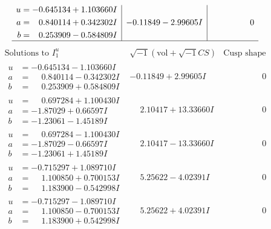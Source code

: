 \documentclass[1p]{elsarticle_modified}
\theoremstyle{definition}
\newcommand{\I}{\sqrt{-1}}
\begin{document}
$$\begin{array}{c|c|c}
\begin{aligned}
u &= -0.645134 + 1.103660 I \\
a &= \phantom{-}0.840114 + 0.342302 I \\
b &= \phantom{-}0.253909 - 0.584809 I\end{aligned}
 & -0.11849 - 2.99605 I & \phantom{-0.000000 } 0\\
 \hline 
 \end{array}$$\newpage$$\begin{array}{c|c|c}  
\text{Solutions to }I^u_{1}& \I (\text{vol} + \sqrt{-1}CS) & \text{Cusp shape}\\
 \hline 
\begin{aligned}
u &= -0.645134 - 1.103660 I \\
a &= \phantom{-}0.840114 - 0.342302 I \\
b &= \phantom{-}0.253909 + 0.584809 I\end{aligned}
 & -0.11849 + 2.99605 I & \phantom{-0.000000 } 0 \\ \hline\begin{aligned}
u &= \phantom{-}0.697284 + 1.100430 I \\
a &= -1.87029 + 0.66597 I \\
b &= -1.23061 - 1.45189 I\end{aligned}
 & \phantom{-}2.10417 + 13.33660 I & \phantom{-0.000000 } 0 \\ \hline\begin{aligned}
u &= \phantom{-}0.697284 - 1.100430 I \\
a &= -1.87029 - 0.66597 I \\
b &= -1.23061 + 1.45189 I\end{aligned}
 & \phantom{-}2.10417 - 13.33660 I & \phantom{-0.000000 } 0 \\ \hline\begin{aligned}
u &= -0.715297 + 1.089710 I \\
a &= \phantom{-}1.100850 + 0.700153 I \\
b &= \phantom{-}1.183900 - 0.542998 I\end{aligned}
 & \phantom{-}5.25622 - 4.02391 I & \phantom{-0.000000 } 0 \\ \hline\begin{aligned}
u &= -0.715297 - 1.089710 I \\
a &= \phantom{-}1.100850 - 0.700153 I \\
b &= \phantom{-}1.183900 + 0.542998 I\end{aligned}
 & \phantom{-}5.25622 + 4.02391 I & \phantom{-0.000000 } 0 \\ \hline\begin{aligned}

\end{aligned}
\end{array}$$
\end{document}
